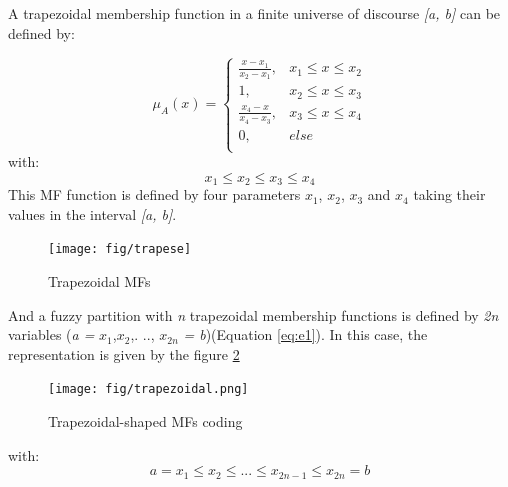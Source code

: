 \documentclass[conference]{IEEEtran}
\begin{document}


A trapezoidal membership function in a finite universe of discourse \textit{[a, b]} can be defined by:

\begin{equation}
\mu_{A}(x)= \left \{
\begin{array}{ll}
\frac{x - x_{1}}{x_{2} - x_{1}},& x_{1} \leq x \leq x_{2}\\
1 , &x_{2} \leq x \leq x_{3}\\
\frac{x_{4} - x}{x_{4} - x_{3}},& x_{3} \leq x \leq x_{4}\\
0        ,& else\\	
\end{array}
\right.
\label{eq:trapmf}
\end{equation}
with:
\begin{equation}
x_{1} \leq x_{2} \leq x_{3} \leq x_{4}
\end{equation}
This MF function is defined by four parameters $x_{1}$, $x_{2}$,
$x_{3}$ and $x_{4}$ taking their values in the interval \textit{[a,
  b]}.%

\begin{figure}[!ht] 
	\begin{center}
		\texttt{[image: fig/trapese]}
		\caption {Trapezoidal MFs}
		\label{fig:trapeze}
	\end{center}
\end{figure}
And a fuzzy partition with \textit{n} trapezoidal membership functions
is defined by \textit{2n} variables (\textit{a =} $ x_{1}$,$x_{2}
$,. .., $x_{2n} $ \textit {= b})(Equation \ref{eq:e1}). In this case,
the representation is given by the
figure \ref{fig:at} 
\begin{figure}[!ht] 
	\begin{center}
		\texttt{[image: fig/trapezoidal.png]}
		\caption {Trapezoidal-shaped MFs coding}
		\label{fig:at}
	\end{center}
\end{figure}
with:
\begin{equation}
a = x_{1} \leq x_{2} \leq...\leq x_{2n-1} \leq x_{2n}=b 	
\end{equation}		
\end{document}
